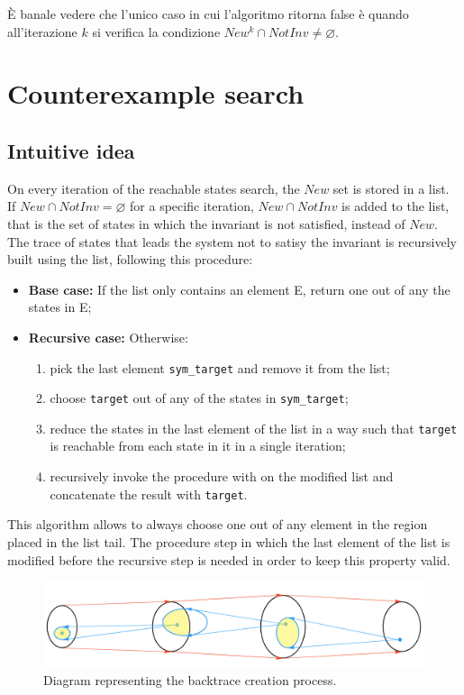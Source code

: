 \documentclass[12pt]{article}
\begin{document}
    È banale vedere che l'unico caso in cui l'algoritmo ritorna false è quando all'iterazione $k$ si verifica la condizione $New^k \cap NotInv \neq \varnothing$.
    
    \section{Counterexample search}
    \subsection{Intuitive idea}
    On every iteration of the reachable states search, the $New$ set is stored in a list.
    If $New \cap NotInv = \varnothing$ for a specific iteration, $New \cap NotInv$ is added to the list, that is the set of states in which the invariant is not satisfied, instead of $New$.
    The trace of states that leads the system not to satisy the invariant is recursively built using the list, following this procedure:
    \begin{itemize}
        \item \textbf{Base case:} If the list only contains an element E, return one out of any the states in E;
        \item \textbf{Recursive case:} Otherwise:
        \begin{enumerate}
            \item pick the last element \texttt{sym\_target} and remove it from the list;
            \item choose \texttt{target} out of any of the states in \texttt{sym\_target};
            \item reduce the states in the last element of the list in a way such that \texttt{target} is reachable from each state in it in a single iteration;
            \item recursively invoke the procedure with on the modified list and concatenate the result with \texttt{target}.
        \end{enumerate}
    \end{itemize}

    This algorithm allows to always choose one out of any element in the region placed in the list tail.
    The procedure step in which the last element of the list is modified before the recursive step is needed in order to keep this property valid.

    \begin{figure}[H] 
        \centering
        \includegraphics[width=\textwidth]{backtrace-diagram.png}
        \caption{Diagram representing the backtrace creation process.}
    \end{figure}
\end{document}
